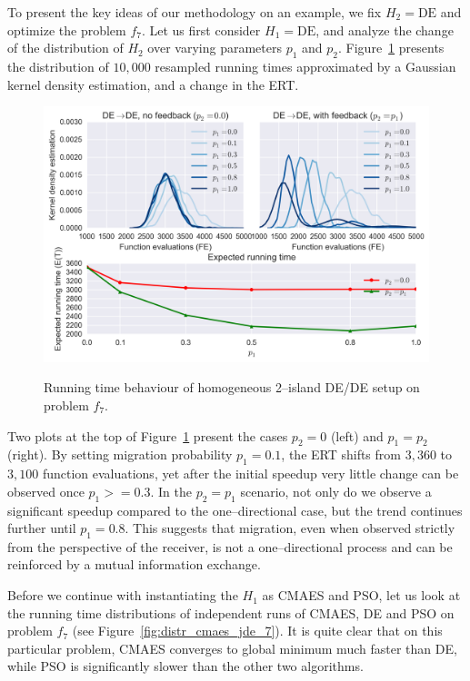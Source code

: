 \documentclass{sig-alternate}
\begin{document}
To present the key ideas of our methodology on an example, we fix $H_2=\mbox{DE}$ and optimize the problem $f_7$.
Let us first consider $H_1 = \mbox{DE}$, and analyze the change of the distribution of $H_2$ over varying parameters $p_1$ and $p_2$.
Figure~\ref{fig:single_jde_jde_7} presents the distribution of $10,000$ resampled running times approximated by a Gaussian kernel density estimation, and a change in the ERT.
\begin{figure}[ht]
  \centering
  \includegraphics[width=\columnwidth]{figures/single_jde_jde_cec_7.png}
  \label{fig:single_jde_jde_7}
 \caption{Running time behaviour of homogeneous 2--island DE/DE setup on problem $f_{7}$.}
\end{figure}

Two plots at the top of Figure~\ref{fig:single_jde_jde_7} present the cases $p_2 = 0$ (left) and $p_1 = p_2$ (right).
By setting migration probability $p_1 = 0.1$, the ERT shifts from $3,360$ to $3,100$ function evaluations, yet after the initial speedup very little change can be observed once $p_1 >= 0.3$.
In the $p_2=p_1$ scenario, not only do we observe a significant speedup compared to the one--directional case, but the trend continues further until $p_1 = 0.8$.
This suggests that migration, even when observed strictly from the perspective of the receiver, is not a one--directional process and can be reinforced by a mutual information exchange.

Before we continue with instantiating the $H_1$ as CMAES and PSO, let us look at the running time distributions of independent runs of CMAES, DE and PSO on problem $f_7$ (see Figure~\ref{fig:distr_cmaes_jde_7}).
It is quite clear that on this particular problem, CMAES converges to global minimum much faster than DE, while PSO is significantly slower than the other two algorithms.
\end{document}
